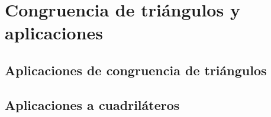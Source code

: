 \thispagestyle{plain}

\section{Congruencia de triángulos y aplicaciones}

\subsection{Aplicaciones de congruencia de triángulos}

\subsection{Aplicaciones a cuadriláteros}

\newpage